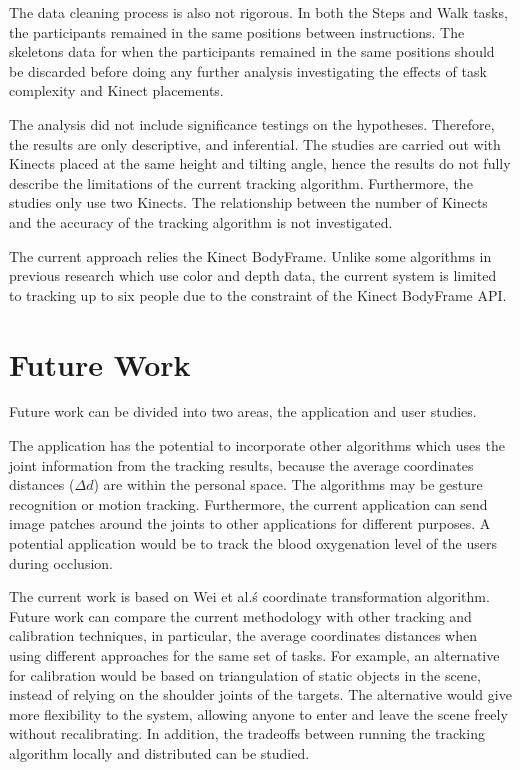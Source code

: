 The data cleaning process is also not rigorous. In both the Steps and Walk tasks, the participants remained in the same positions between instructions. The skeletons data for when the participants remained in the same positions should be discarded before doing any further analysis investigating the effects of task complexity and Kinect placements.

The analysis did not include significance testings on the hypotheses. Therefore, the results are only descriptive, and inferential. The studies are carried out with Kinects placed at the same height and tilting angle, hence the results do not fully describe the limitations of the current tracking algorithm. Furthermore, the studies only use two Kinects. The relationship between the number of Kinects and the accuracy of the tracking algorithm is not investigated.

The current approach relies the Kinect BodyFrame. Unlike some algorithms in previous research which use color and depth data, the current system is limited to tracking up to six people due to the constraint of the Kinect BodyFrame API.

\section{Future Work}
\label{sec:discussion_future_Work}

Future work can be divided into two areas, the application and user studies.

The application has the potential to incorporate other algorithms which uses the joint information from the tracking results, because the average coordinates distances ($\Delta d$) are within the personal space. The algorithms may be gesture recognition or motion tracking. Furthermore, the current application can send image patches around the joints to other applications for different purposes. A potential application would be to track the blood oxygenation level of the users during occlusion.

The current work is based on Wei et al.\'s coordinate transformation algorithm. Future work can compare the current methodology with other tracking and calibration techniques, in particular, the average coordinates distances when using different approaches for the same set of tasks. For example, an alternative for calibration would be based on triangulation of static objects in the scene, instead of relying on the shoulder joints of the targets. The alternative would give more flexibility to the system, allowing anyone to enter and leave the scene freely without recalibrating. In addition, the tradeoffs between running the tracking algorithm locally and distributed can be studied.

